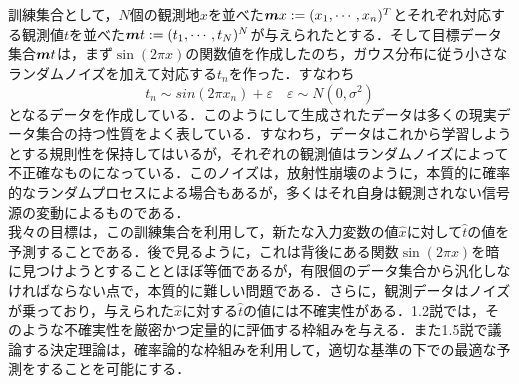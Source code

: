 \documentclass[a4j,11pt]{jsarticle}
\newcommand{\bm}{\mbox{\boldmath {$m$}}}
\numberwithin{equation}{section}
\begin{document}
\large

\section{}
\subsection{}訓練集合として，$N$個の観測地$x$を並べた${\bm x}:=(x_1,\cdots,x_n)^T $とそれぞれ対応する観測値$t$を並べた${\bm t}:= (t_1,\cdots,t_N)^N$が与えられたとする．そして目標データ集合${\bm t}$は，まず$\sin(2\pi x)$の関数値を作成したのち，ガウス分布に従う小さなランダムノイズを加えて対応する$t_n$を作った．すなわち
$$t_n \sim sin(2\pi x_n) + \varepsilon \quad \varepsilon \sim N(0,\sigma^2)$$
となるデータを作成している．このようにして生成されたデータは多くの現実データ集合の持つ性質をよく表している．すなわち，データはこれから学習しようとする規則性を保持してはいるが，それぞれの観測値はランダムノイズによって不正確なものになっている．このノイズは，放射性崩壊のように，本質的に確率的なランダムプロセスによる場合もあるが，多くはそれ自身は観測されない信号源の変動によるものである．\\

我々の目標は，この訓練集合を利用して，新たな入力変数の値$\hat{x}$に対して$\hat{t}$の値を予測することである．後で見るように，これは背後にある関数$\sin (2\pi x)$を暗に見つけようとすることとほぼ等価であるが，有限個のデータ集合から汎化しなければならない点で，本質的に難しい問題である．さらに，観測データはノイズが乗っており，与えられた$\hat{x}$に対する$\hat t$の値には不確実性がある．1.2説では，そのような不確実性を厳密かつ定量的に評価する枠組みを与える．また1.5説で議論する決定理論は，確率論的な枠組みを利用して，適切な基準の下での最適な予測をすることを可能にする．\\
\end{document}
